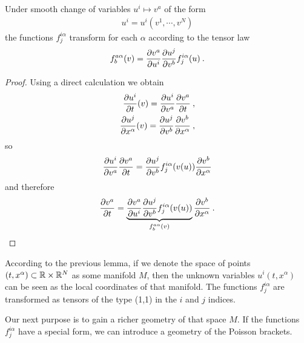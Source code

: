 \begin{proposition} 
    \label{prop:transformace-A} 
    Under smooth change of variables $u^i \mapsto v^a$ of the form
    \begin{align}
        u^i = u^i(v^1,\cdots, v^N)
    \end{align}
    the functions $f^{i\alpha}_{j}$ transform for each $\alpha$ according to the tensor law
    \begin{align}
        f^{a \alpha}_{b}(v) = \frac{\partial v^a}{\partial u^i} \frac{\partial u^j}{\partial v^b} f^{i \alpha}_j (u) \:.
    \end{align}
\end{proposition}
\begin{proof}
    Using a direct calculation we obtain
    \begin{align}
        \frac{\partial u^i}{\partial t}(v) = \frac{\partial u^i}{\partial v^a} \frac{\partial v^a}{\partial t} \:, \\
        \frac{\partial u^j}{\partial x^\alpha}(v) = \frac{\partial u^j}{\partial v^b} \frac{\partial v^b}{\partial x^\alpha}\:,
    \end{align}
    so
    \begin{align}
        \frac{\partial u^i}{\partial v^a} \frac{\partial v^a}{\partial t} = \frac{\partial u^j}{\partial v^b} f^{i \alpha}_j (v(u)) \frac{\partial v^b}{\partial x^\alpha}
    \end{align}
    and therefore
    \begin{align}
        \frac{\partial v^a}{\partial t} = \underbrace{\frac{\partial v^a}{\partial u^i} \frac{\partial u^j}{\partial v^b} f^{i \alpha}_j(v(u))}_{f^{a \alpha}_b(v)} \frac{\partial v^b}{\partial x^\alpha} \:.
    \end{align}
\end{proof}

According to the previous lemma, if we denote the space of points $(t,x^\alpha) \subset \mathbb{R} \times \mathbb{R}^N$ as some manifold $M$, then the unknown variables $u^i(t,x^\alpha)$ can be seen as the local coordinates of that manifold. The functions $f^{i \alpha}_j$ are transformed as tensors of the type (1,1) in the $i$ and $j$ indices.

Our next purpose is to gain a richer geometry of that space $M$. If the functions $f^{i \alpha}_j$ have a special form, we can introduce a geometry of the Poisson brackets.

